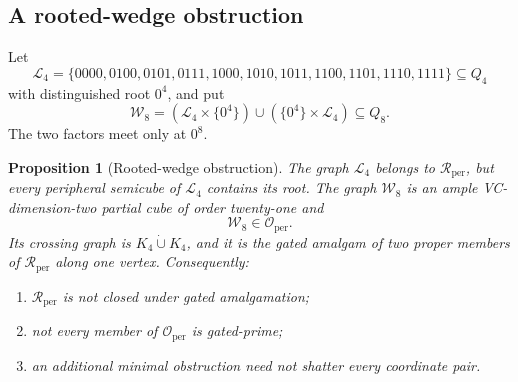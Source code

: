 \documentclass[11pt]{article}
\newtheorem{proposition}[theorem]{Proposition}
\theoremstyle{definition}
\theoremstyle{remark}
\newcommand{\Rper}{\mathcal R_{\mathrm{per}}}
\newcommand{\Oper}{\mathcal O_{\mathrm{per}}}
\begin{document}
\subsection{A rooted-wedge obstruction}

Let
\begin{equation}
 \mathcal L_4=
 \{0000,0100,0101,0111,1000,1010,1011,1100,1101,1110,1111\}
 \subseteq Q_4
 \label{eq:L4}
\end{equation}
with distinguished root \(0^4\), and put
\begin{equation}
 \mathcal W_8
 =(\mathcal L_4\times\{0^4\})
   \cup(\{0^4\}\times\mathcal L_4)
 \subseteq Q_8.
 \label{eq:W8}
\end{equation}
The two factors meet only at \(0^8\).

\begin{proposition}[Rooted-wedge obstruction]
\label{prop:rooted-wedge-obstruction}
The graph \(\mathcal L_4\) belongs to \(\Rper\), but every peripheral
semicube of \(\mathcal L_4\) contains its root.  The graph \(\mathcal W_8\)
is an ample VC-dimension-two partial cube of order twenty-one and
\[
 \mathcal W_8\in\Oper.
\]
Its crossing graph is \(K_4\mathbin{\dot\cup}K_4\), and it is the gated
amalgam of two proper members of \(\Rper\) along one vertex.  Consequently:
\begin{enumerate}[label=\textup{(\roman*)}]
  \item \(\Rper\) is not closed under gated amalgamation;
  \item not every member of \(\Oper\) is gated-prime;
  \item an additional minimal obstruction need not shatter every coordinate
        pair.
\end{enumerate}
\end{proposition}
\end{document}
